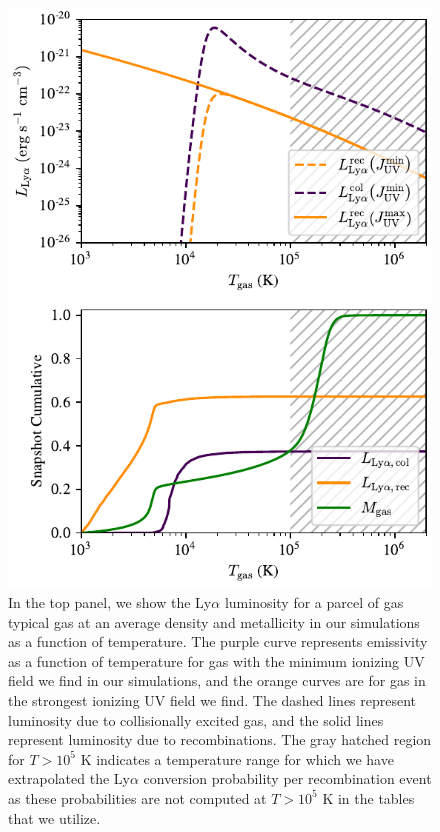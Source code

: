 \begin{figure}
  \centering
    \includegraphics[width=\textwidth,height=0.8\textheight,keepaspectratio]{figures/luminosity_vs_temperature.pdf}
  \caption{
    In the top panel, we show the Ly$\alpha$ luminosity for a parcel of gas typical gas at an average density and metallicity in our simulations as a function of temperature.
    The purple curve represents emissivity as a function of temperature for gas with the minimum ionizing UV field we find in our simulations, and the orange curves are for gas in the strongest ionizing UV field we find.
    The dashed lines represent luminosity due to collisionally excited gas, and the solid lines represent luminosity due to recombinations.
    The gray hatched region for $T > 10^5$ K indicates a temperature range for which we have extrapolated the Ly$\alpha$ conversion probability per recombination event as these probabilities are not computed at $T>10^5$ K in the \citet{Pengelly1964} tables that we utilize.
  }
  \label{fig:luminosity_vs_temperature}
\end{figure}



